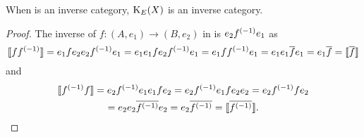 \begin{lemma}\label{lem:the_idempotent_splitting_of_an_inverse_category_is_an_inverse_category}
  When \X is an inverse category, $\text{K}_{E}(X)$ is an inverse category.
\end{lemma}
\begin{proof}
  The inverse of $f:(A,e_1)\to(B,e_2)$   in  is $e_2{f}^{(-1)}e_1$ as
  \[
    \llbracket f {f}^{(-1)} \rrbracket = e_1 f e_2 e_2 {f}^{(-1)} e_1
    = e_1 e_1 f e_2 {f}^{(-1)} e_1
    = e_1 f  {f}^{(-1)} e_1
    = e_1 e_1 \overline{f} e_1
    = e_1 \overline{f}
    = \llbracket\overline{f}\rrbracket
  \]
  and
  \begin{multline*}
    \llbracket {f}^{(-1)} f\rrbracket=
    e_2 {f}^{(-1)} e_1 e_1 f e_2
    = e_2 {f}^{(-1)} e_1 f e_2 e_2
    = e_2 {f}^{(-1)} f  e_2\\
    = e_2 e_2 \overline{{f}^{(-1)}}  e_2
    = e_2 \overline{{f}^{(-1)}}
    = \llbracket\overline{{f}^{(-1)}}\rrbracket.
  \end{multline*}

\end{proof}

